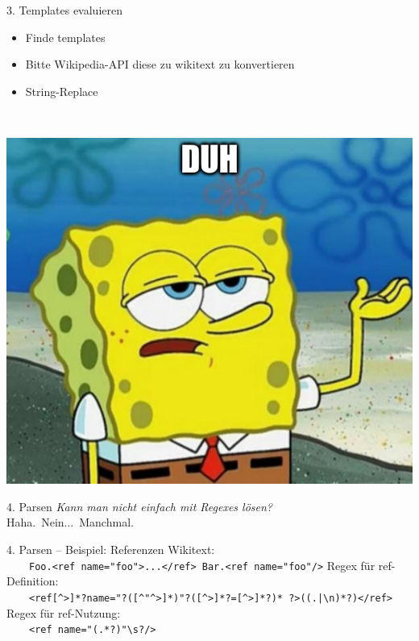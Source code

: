 \documentclass[9pt]{beamer}
\begin{document}
	\begin{frame}{3. Templates evaluieren}
		\begin{itemize}
			\item Finde templates
			\item Bitte Wikipedia-API diese zu wikitext zu konvertieren
			\item String-Replace
		\end{itemize}
		~\\
		\pause
		\begin{center}
			\includegraphics[height=0.5\textheight]{images/meme-spongebob-duh.png}
		\end{center}
	\end{frame}

	\begin{frame}[fragile]{4. Parsen}
		\textit{Kann man nicht einfach mit Regexes lösen?}\\\pause
		Haha.\pause\ Nein.\pause..\ Manchmal.
	\end{frame}

	\begin{frame}[fragile]{4. Parsen -- Beispiel: Referenzen}
		Wikitext:\\
		~~~~\verb+Foo.<ref name="foo">...</ref> Bar.<ref name="foo"/>+\n\pause
		Regex für ref-Definition:\\
		~~~~\verb+<ref[^>]*?name="?([^"^>]*)"?([^>]*?=[^>]*?)* ?>((.|\n)*?)</ref>+\n
		Regex für ref-Nutzung:\\
		~~~~\verb+<ref name="(.*?)"\s?/>+
	\end{frame}
\end{document}
